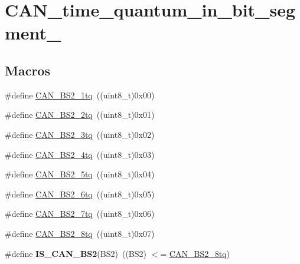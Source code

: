 \hypertarget{group___c_a_n__time__quantum__in__bit__segment__2}{\section{C\-A\-N\-\_\-time\-\_\-quantum\-\_\-in\-\_\-bit\-\_\-segment\-\_}
\label{group___c_a_n__time__quantum__in__bit__segment__2}
}
\subsection*{Macros}
\begin{DoxyCompactItemize}
\item 
\#define \hyperlink{group___c_a_n__time__quantum__in__bit__segment__2_gad9af25a3f61df7b09b8d6a5e81d8027e}{C\-A\-N\-\_\-\-B\-S2\-\_\-1tq}~((uint8\-\_\-t)0x00)
\item 
\#define \hyperlink{group___c_a_n__time__quantum__in__bit__segment__2_gac43d82f74990620499f1998187ff3602}{C\-A\-N\-\_\-\-B\-S2\-\_\-2tq}~((uint8\-\_\-t)0x01)
\item 
\#define \hyperlink{group___c_a_n__time__quantum__in__bit__segment__2_gab3d325ce4a5d0eb1ee8ee50ad4ec7e49}{C\-A\-N\-\_\-\-B\-S2\-\_\-3tq}~((uint8\-\_\-t)0x02)
\item 
\#define \hyperlink{group___c_a_n__time__quantum__in__bit__segment__2_gaaff1c1cdd809f185299971c6437f32a0}{C\-A\-N\-\_\-\-B\-S2\-\_\-4tq}~((uint8\-\_\-t)0x03)
\item 
\#define \hyperlink{group___c_a_n__time__quantum__in__bit__segment__2_ga89feba32bcc2e909f858d535edaad101}{C\-A\-N\-\_\-\-B\-S2\-\_\-5tq}~((uint8\-\_\-t)0x04)
\item 
\#define \hyperlink{group___c_a_n__time__quantum__in__bit__segment__2_ga72c3245b794d3238763d1ec319bf386f}{C\-A\-N\-\_\-\-B\-S2\-\_\-6tq}~((uint8\-\_\-t)0x05)
\item 
\#define \hyperlink{group___c_a_n__time__quantum__in__bit__segment__2_ga8005adaef02fb90e400909de08dec031}{C\-A\-N\-\_\-\-B\-S2\-\_\-7tq}~((uint8\-\_\-t)0x06)
\item 
\#define \hyperlink{group___c_a_n__time__quantum__in__bit__segment__2_gaad8dcbb266cf5074bfb67bd7108597c6}{C\-A\-N\-\_\-\-B\-S2\-\_\-8tq}~((uint8\-\_\-t)0x07)
\item 
\hypertarget{group___c_a_n__time__quantum__in__bit__segment__2_ga3f5620b1d094dbd7d2fb8d16f4b187a9}{\#define {\bfseries I\-S\-\_\-\-C\-A\-N\-\_\-\-B\-S2}(B\-S2)~((B\-S2) $<$= \hyperlink{group___c_a_n__time__quantum__in__bit__segment__2_gaad8dcbb266cf5074bfb67bd7108597c6}{C\-A\-N\-\_\-\-B\-S2\-\_\-8tq})}\label{group___c_a_n__time__quantum__in__bit__segment__2_ga3f5620b1d094dbd7d2fb8d16f4b187a9}

\end{DoxyCompactItemize}


